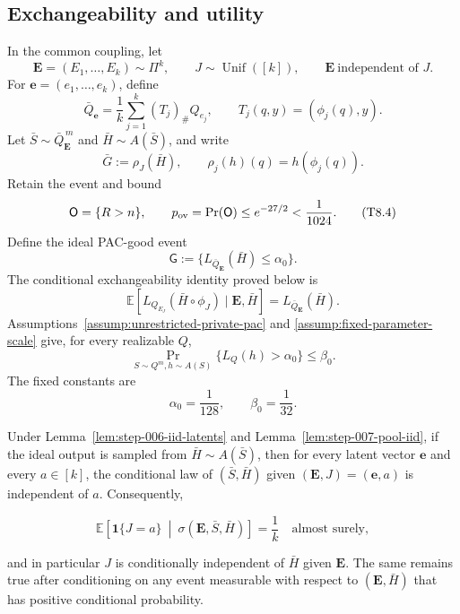 \subsection{Exchangeability and utility}
\label{app:step-008}

In the common coupling, let
\[
\mathbf E=(E_1,\ldots,E_k)\sim\Pi^k,
\qquad
J\sim\operatorname{Unif}([k]),
\qquad
\mathbf E\ \text{independent of }J.
\tag{T8.1}\label{eq:step-008-t8-1}
\]
For $\mathbf e=(e_1,\ldots,e_k)$, define
\[
\bar Q_{\mathbf e}=\frac1k\sum_{j=1}^k(T_j)_\#Q_{e_j},
\qquad T_j(q,y)=(\phi_j(q),y).
\tag{T8.2}\label{eq:step-008-t8-2}
\]
Let $\bar S\sim\bar Q_{\mathbf E}^{\,m}$ and
$\bar H\sim A(\bar S)$, and write
\[
\bar G:=\rho_J(\bar H),
\qquad \rho_j(h)(q)=h(\phi_j(q)).
\tag{T8.3}\label{eq:step-008-t8-3}
\]
Retain the event and bound
\[
\mathsf O=\{R>n\},
\qquad p_{\rm ov}=\Pr(\mathsf O)\leq e^{-27/2}<\frac1{1024}.
\tag{T8.4}\label{eq:step-008-t8-4}
\]
Define the ideal PAC-good event
\[
\mathsf G
:=\{L_{\bar Q_{\mathbf E}}(\bar H)\leq\alpha_0\}.
\tag{T8.5}\label{eq:step-008-t8-5}
\]
The conditional exchangeability identity proved below is
\[
\mathbb E\!\left[
  L_{Q_{E_J}}(\bar H\circ\phi_J)
  \mid \mathbf E,\bar H
\right]
=L_{\bar Q_{\mathbf E}}(\bar H).
\tag{EX-c}\label{eq:step-008-ex-c}
\]
Assumptions~\ref{assump:unrestricted-private-pac} and
\ref{assump:fixed-parameter-scale} give, for every realizable $Q$,
\[
\Pr_{S\sim Q^m,h\sim A(S)}\{L_Q(h)>\alpha_0\}\leq\beta_0.
\tag{A8.1}\label{eq:step-008-a8-1}
\]
The fixed constants are
\[
\alpha_0=\frac1{128},\qquad\beta_0=\frac1{32}.
\tag{A8.2}\label{eq:step-008-a8-2}
\]



\begin{lemma}
\label{lem:step-008-ancillary}

Under Lemma~\ref{lem:step-006-iid-latents} and
Lemma~\ref{lem:step-007-pool-iid}, if the ideal output is sampled from
\(\bar H\sim A(\bar S)\), then for every latent vector
\(\mathbf e\) and every \(a\in[k]\), the conditional law of
\((\bar S,\bar H)\) given
\((\mathbf E,J)=(\mathbf e,a)\) is independent of \(a\).  Consequently,

\[
\mathbb E\!\left[
\mathbf1\{J=a\}
\ \middle|\ \sigma(\mathbf E,\bar S,\bar H)
\right]
=\frac1k
\quad\text{almost surely},
\tag{1}\label{eq:step-008-1}
\]

and in particular \(J\) is conditionally independent of \(\bar H\)
given \(\mathbf E\).  The same remains true after conditioning on any
event measurable with respect to \((\mathbf E,\bar H)\) that has
positive conditional probability.

\end{lemma}

